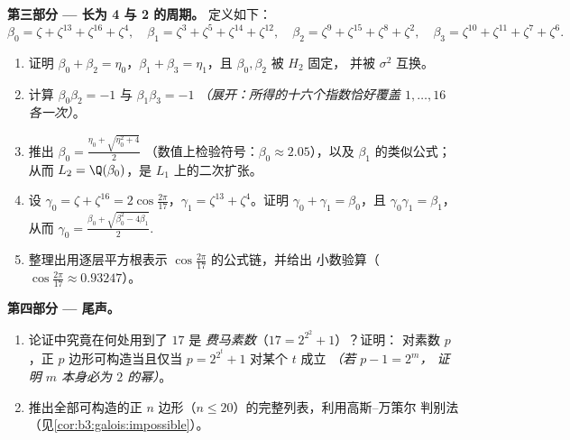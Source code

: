 \begin{problem}
\medskip
\noindent\textbf{第三部分 --- 长为 4 与 2 的周期。}
定义如下：
\[
\beta_0 = \zeta + \zeta^{13} + \zeta^{16} + \zeta^{4},\quad
\beta_1 = \zeta^3 + \zeta^5 + \zeta^{14} + \zeta^{12},\quad
\beta_2 = \zeta^9 + \zeta^{15} + \zeta^{8} + \zeta^{2},\quad
\beta_3 = \zeta^{10} + \zeta^{11} + \zeta^{7} + \zeta^{6}.
\]
\begin{enumerate}[resume]
  \item 证明 $\beta_0 + \beta_2 = \eta_0$，$\beta_1 + \beta_3 =
        \eta_1$，且 $\beta_0, \beta_2$ 被 $H_2$ 固定，
        并被 $\sigma^2$ 互换。
  \item 计算 $\beta_0\beta_2 = -1$ 与 $\beta_1\beta_3 = -1$
        \emph{（展开：所得的十六个指数恰好覆盖
        $1, \dots, 16$ 各一次）}。
  \item 推出 $\beta_0 = \frac{\eta_0 + \sqrt{\eta_0^2 + 4}}2$
        （数值上检验符号：$\beta_0 \approx 2.05$），以及
        $\beta_1$ 的类似公式；从而 $L_2 =
        \Q(\beta_0)$，是 $L_1$ 上的二次扩张。
  \item 设 $\gamma_0 = \zeta + \zeta^{16} =
        2\cos\frac{2\pi}{17}$，$\gamma_1 = \zeta^{13} +
        \zeta^4$。证明 $\gamma_0 + \gamma_1 = \beta_0$，且
        $\gamma_0\gamma_1 = \beta_1$，从而 $\gamma_0 =
        \frac{\beta_0 + \sqrt{\beta_0^2 - 4\beta_1}}2$.
  \item 整理出用逐层平方根表示
        $\cos\frac{2\pi}{17}$ 的公式链，并给出
        小数验算（$\cos\frac{2\pi}{17} \approx 0.93247$）。
\end{enumerate}

\medskip
\noindent\textbf{第四部分 --- 尾声。}
\begin{enumerate}[resume]
  \item 论证中究竟在何处用到了 $17$ 是
        \emph{费马素数}（$17 = 2^{2^2} + 1$）？证明：
        对素数 $p$，正 $p$ 边形可构造当且仅当 $p
        = 2^{2^t} + 1$ 对某个 $t$ 成立 \emph{（若 $p - 1 = 2^m$，
        证明 $m$ 本身必为 $2$ 的幂）}。
  \item 推出全部可构造的正
        $n$ 边形（$n \leq 20$）的完整列表，利用高斯--万策尔
        判别法（见\cref{cor:b3:galois:impossible}）。
\end{enumerate}


\end{problem}
